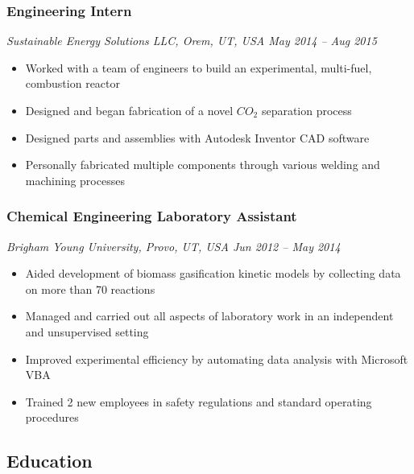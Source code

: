 \hypertarget{engineering-intern}{%
\subsubsection{Engineering Intern}\label{engineering-intern}}

\emph{Sustainable Energy Solutions LLC, Orem, UT, USA \textbar{} May
2014 -- Aug 2015}

\begin{itemize}
\tightlist
\item
  Worked with a team of engineers to build an experimental, multi-fuel,
  combustion reactor
\item
  Designed and began fabrication of a novel \(CO_2\)\hspace{0pt}
  separation process
\item
  Designed parts and assemblies with Autodesk Inventor CAD software
\item
  Personally fabricated multiple components through various welding and
  machining processes
\end{itemize}

\hypertarget{chemical-engineering-laboratory-assistant}{%
\subsubsection{Chemical Engineering Laboratory
Assistant}\label{chemical-engineering-laboratory-assistant}}

\emph{Brigham Young University, Provo, UT, USA \textbar{} Jun 2012 --
May 2014}

\begin{itemize}
\tightlist
\item
  Aided development of biomass gasification kinetic models by collecting
  data on more than 70 reactions
\item
  Managed and carried out all aspects of laboratory work in an
  independent and unsupervised setting
\item
  Improved experimental efficiency by automating data analysis with
  Microsoft VBA
\item
  Trained 2 new employees in safety regulations and standard operating
  procedures
\end{itemize}

\hypertarget{education}{%
\subsection{Education}\label{education}}

